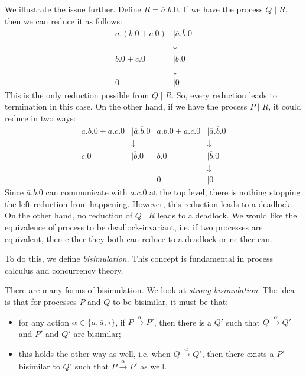 \documentclass[a4paper, openany]{memoir}
\theoremstyle{definition}
\begin{document}
    We illustrate the issue further. Define $R = \overline{a}.\overline{b}.0$. If we have the process $Q \mid R$, then we can reduce it as follows:
    \begin{align*}
        a.(b.0 + c.0) &\mid \overline{a}.\overline{b}.0 \\
        &\downarrow \\
        b.0 + c.0 &\mid \overline{b}.0 \\
        &\downarrow \\
        0 &\mid 0
    \end{align*}
    This is the only reduction possible from $Q \mid R$. So, every reduction leads to termination in this case. On the other hand, if we have the process $P \mid R$, it could reduce in two ways:
    \begin{align*}
        a.b.0 + a.c.0 &\mid \overline{a}.\overline{b}.0  & a.b.0 + a.c.0 &\mid \overline{a}.\overline{b}.0 \\
        &\downarrow & &\downarrow \\
        c.0 &\mid \overline{b}.0 & b.0 &\mid \overline{b}.0 \\
        & & &\downarrow \\
        & & 0 &\mid 0
    \end{align*}
    Since $\overline{a}.\overline{b}.0$ can communicate with $a.c.0$ at the top level, there is nothing stopping the left reduction from happening. However, this reduction leads to a deadlock. On the other hand, no reduction of $Q \mid R$ leads to a deadlock. We would like the equivalence of process to be deadlock-invariant, i.e. if two processes are equivalent, then either they both can reduce to a deadlock or neither can.

    To do this, we define \emph{bisimulation}. This concept is fundamental in process calculus and concurrency theory.

    There are many forms of bisimulation. We look at \emph{strong bisimulation}. The idea is that for processes $P$ and $Q$ to be bisimilar, it must be that:
    \begin{itemize}
        \item for any action $\alpha \in \{a, \overline{a}, \tau\}$, if $P \xrightarrow{\alpha} P'$, then there is a $Q'$ such that $Q \xrightarrow{\alpha} Q'$ and $P'$ and $Q'$ are bisimilar;
        \item this holds the other way as well, i.e. when $Q \xrightarrow{\alpha} Q'$, then there exists a $P'$ bisimilar to $Q'$ such that $P \xrightarrow{\alpha} P'$ as well.
    \end{itemize}
\end{document}
